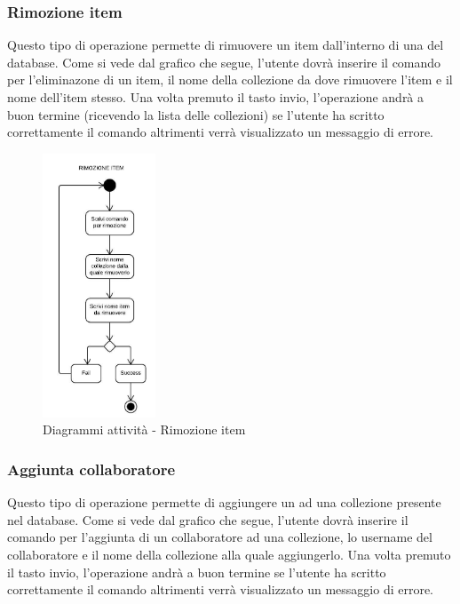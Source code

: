 \documentclass{scalatekids-article}
\begin{document}
\subsubsection{Rimozione item}

Questo tipo di operazione permette di rimuovere un item dall'interno di una
 del database. Come si vede dal grafico che segue, l'utente
dovrà inserire il comando per l'eliminazone di un item, il nome della
collezione da dove rimuovere l'item e il nome dell'item stesso. Una volta
premuto il tasto invio, l'operazione andrà a buon termine (ricevendo la lista
delle collezioni) se l'utente ha scritto correttamente il comando altrimenti
verrà visualizzato un messaggio di errore.

\begin{figure}[H]
  \begin{center}
    \includegraphics[width=0.3\textwidth, keepaspectratio]{img/diagrammiAttivita/rimozioneItem.jpeg}
    \caption{Diagrammi attività - Rimozione item}
  \end{center}
\end{figure}

\subsubsection{Aggiunta collaboratore}

Questo tipo di operazione permette di aggiungere un  ad
una collezione presente nel database. Come si vede dal grafico che segue,
l'utente dovrà inserire il comando per l'aggiunta di un collaboratore ad una
collezione, lo username del collaboratore e il nome della collezione alla
quale aggiungerlo. Una volta premuto il tasto invio, l'operazione andrà a buon
termine se l'utente ha scritto correttamente il comando altrimenti verrà
visualizzato un messaggio di errore.
\end{document}
